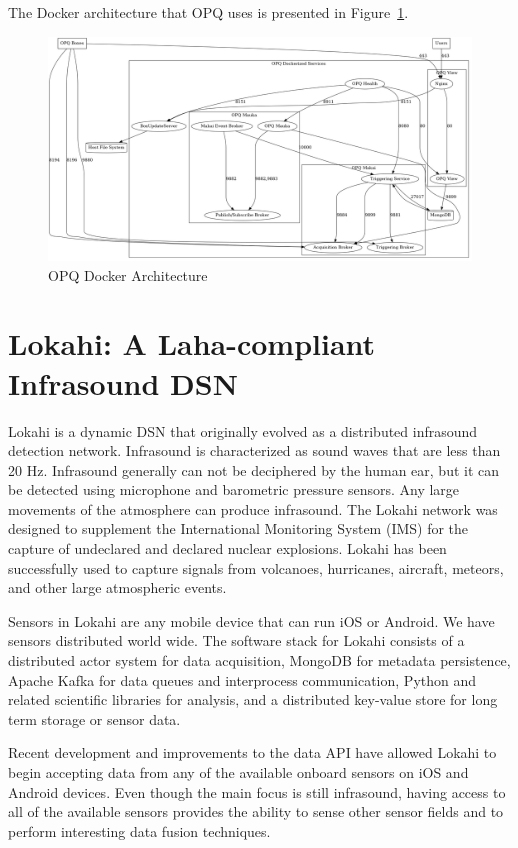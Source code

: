 The Docker architecture that OPQ uses is presented in Figure~\ref{fig:docker_deploy}.

\begin{figure}
	\centering
	\includegraphics[width=1\linewidth]{figures/docker_deploy.png}
	\caption{OPQ Docker Architecture}\label{fig:docker_deploy}
\end{figure}

\section{Lokahi: A Laha-compliant Infrasound DSN}\label{sec:lokahi:-a-laha-compliant-infrasound-dsn}
Lokahi is a dynamic DSN that originally evolved as a distributed infrasound detection network. Infrasound is characterized as sound waves that are less than 20 Hz. Infrasound generally can not be deciphered by the human ear, but it can be detected using microphone and barometric pressure sensors. Any large movements of the atmosphere can produce infrasound. The Lokahi network was designed to supplement the International Monitoring System (IMS) for the capture  of undeclared and declared nuclear explosions. Lokahi has been successfully used to capture signals from volcanoes, hurricanes, aircraft, meteors, and other large atmospheric events.

Sensors in Lokahi are any mobile device that can run iOS or Android. We have sensors distributed world wide. The software stack for Lokahi consists of a distributed actor system for data acquisition, MongoDB for metadata persistence, Apache Kafka for data queues and interprocess communication, Python and related scientific libraries for analysis, and a distributed key-value store for long term storage or sensor data.

Recent development and improvements to the data API have allowed Lokahi to begin accepting data from any of the available onboard sensors on iOS and Android devices. Even though the main focus is still infrasound, having access to all of the available sensors provides the ability to sense other sensor fields and to perform interesting data fusion techniques.

